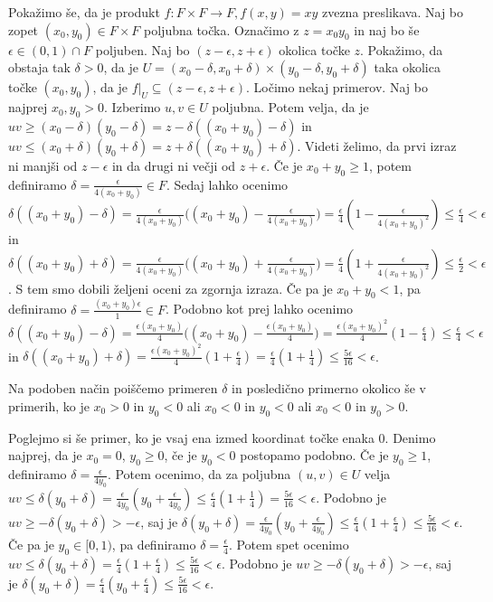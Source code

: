\documentclass[a4paper, 12pt]{article}
\begin{document}
Pokažimo še, da je produkt $f:F\times F \rightarrow F, f(x,y) = xy$ zvezna preslikava. Naj bo zopet $(x_0,y_0)\in F\times F$ poljubna točka. Označimo z $z = x_0 y_0$ in naj bo še $\epsilon \in (0,1)\cap F$ poljuben. Naj bo $(z-\epsilon, z+\epsilon)$ okolica točke $z$. Pokažimo, da obstaja tak $\delta > 0$, da je $U = (x_0 - \delta, x_0 + \delta) \times (y_0 - \delta, y_0 + \delta)$ taka okolica točke $(x_0,y_0)$, da je $f|_{U}\subseteq (z-\epsilon, z+ \epsilon)$. Ločimo nekaj primerov. Naj bo najprej $x_0,y_0 > 0$. Izberimo $u,v\in U$ poljubna. Potem velja, da je $uv \ge (x_0 - \delta)(y_0 - \delta) = z - \delta ((x_0 + y_0) - \delta)$ in $uv \le (x_0 + \delta)(y_0 + \delta) = z + \delta((x_0 + y_0) + \delta)$. Videti želimo, da prvi izraz ni manjši od $z- \epsilon$ in da drugi ni večji od $z+\epsilon$.
 Če je $x_0  + y_0 \ge 1$, potem definiramo $\delta = \frac{\epsilon}{4(x_0 + y_0)} \in F$. Sedaj lahko ocenimo $\delta((x_0 + y_0) -\delta) = \frac{\epsilon}{4(x_0 + y_0)}\big( (x_0 + y_0) - \frac{\epsilon}{4(x_0 + y_0)}\big)  = \frac{\epsilon }{4}(1 - \frac{\epsilon}{4(x_0 + y_0)^2})\le \frac{\epsilon}{4} <  \epsilon $ in 
$\delta((x_0 + y_0) +\delta) = \frac{\epsilon}{4(x_0 + y_0)}\big( (x_0 + y_0) + \frac{\epsilon}{4(x_0 + y_0)}\big)  = \frac{\epsilon }{4}(1 + \frac{\epsilon}{4(x_0 + y_0)^2})\le \frac{\epsilon}{2} <  \epsilon $. S tem smo dobili željeni oceni za zgornja izraza. Če pa je $x_0 + y_0 < 1$, pa definiramo $\delta = \frac{(x_0 + y_0)\epsilon}{1}\in F$. Podobno kot prej lahko ocenimo $\delta((x_0 + y_0) -\delta) = \frac{\epsilon (x_0 + y_0)}{4}\big( (x_0 + y_0) - \frac{\epsilon (x_0 + y_0)}{4}\big)  = \frac{\epsilon (x_0+y_0)^2}{4}(1 - \frac{\epsilon}{4})\le \frac{\epsilon}{4} <  \epsilon $ in $\delta((x_0 + y_0) +\delta) = \frac{\epsilon (x_0 + y_0)^2}{4}(1 + \frac{\epsilon}{4})  = \frac{\epsilon }{4}(1 +\frac{1}{4})\le \frac{5\epsilon}{16} <  \epsilon $.
 
Na podoben način poiščemo primeren $\delta$ in posledično primerno okolico še v primerih,  ko je $x_0> 0$ in $y_0 < 0$ ali $x_0 < 0$ in $y_0 < 0$ ali $x_0 < 0$ in $y_0 > 0$.

Poglejmo si še primer, ko je vsaj ena izmed koordinat točke enaka 0. Denimo najprej, da je $x_0 = 0$, $y_0 \ge 0$, če je $y_0 < 0$ postopamo podobno. Če je $y_0 \ge 1$, definiramo $\delta = \frac{\epsilon}{4 y_0}$. Potem ocenimo, da za poljubna $(u,v)\in U$ velja $uv \le \delta (y_0 + \delta) =\frac{\epsilon}{4y_0}(y_0 + \frac{\epsilon}{4y_0} ) \le \frac{\epsilon}{4}(1+\frac{1}{4}) = \frac{5\epsilon}{16} < \epsilon$. Podobno je $uv \ge -\delta (y_0 + \delta) > - \epsilon$, saj je $\delta (y_0 + \delta ) = \frac{\epsilon}{4y_0} (y_0 + \frac{\epsilon}{4y_0}) \le  \frac{\epsilon}{4} ( 1 + \frac{\epsilon}{4}) \le \frac{5\epsilon}{16} < \epsilon $.
 Če pa je $y_0 \in [0,1)$, pa definiramo $\delta = \frac{\epsilon}{4}$. Potem spet ocenimo $uv \le \delta(y_0 + \delta) = \frac{\epsilon}{4} (1 + \frac{\epsilon}{4}) \le \frac{5\epsilon}{16} < \epsilon$. Podobno je $uv \ge - \delta (y_0 + \delta) > - \epsilon$, saj je $\delta (y_0 + \delta ) = \frac{\epsilon}{4} (y_0 + \frac{\epsilon }{4}) \le \frac{5\epsilon}{16} < \epsilon $.
\end{document}
